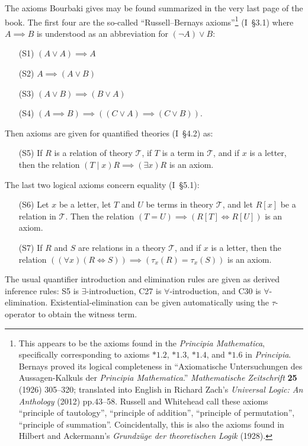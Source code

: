 \documentclass{amsart}
\begin{document}
The axioms Bourbaki gives may be found summarized in the very last page
of the book. The first four are the so-called ``Russell--Bernays
axioms''\footnote{This appears to be the axioms found in the
\textit{Principia Mathematica}, specifically corresponding to axioms
$*1.2$, $*1.3$, $*1.4$, and $*1.6$ in \textit{Principia}. Bernays proved
its logical completeness in ``Axiomatische Untersuchungen des
Aussagen-Kalkuls der \textit{Principia Mathematica}.''
\textit{Mathematische Zeitschrift} \textbf{25} (1926) 305--320;
translated into English in Richard Zach's \textit{Universal Logic: An
  Anthology} (2012) pp.43--58. Russell and Whitehead call these axioms
``principle of tautology'', ``principle of addition'',
``principle of permutation'', ``principle of
summation''. Coincidentally, this is also the axioms found in Hilbert
and Ackermann's \textit{Grundz\"{u}ge der theoretischen Logik} (1928).} (I~\S3.1) where $A\implies B$ is
understood as an abbreviation for $(\neg A)\lor B$:
\begin{itemize}
\item[(S1)] $(A\lor A)\implies A$
\item[(S2)] $A\implies(A\lor B)$
\item[(S3)] $(A\lor B)\implies(B\lor A)$
\item[(S4)] $(A\implies B)\implies((C\lor A)\implies(C\lor B))$.
\end{itemize}
Then axioms are given for quantified theories (I~\S4.2) as:
\begin{itemize}
\item[(S5)] If $R$ is a relation of theory $\mathscr{T}$, if $T$ is a
  term in $\mathscr{T}$, and if $x$ is a letter, then the relation
  $(T\mid x)R\implies(\exists x)R$ is an axiom.
\end{itemize}
The last two logical axioms concern equality (I~\S5.1):
\begin{itemize}
\item[(S6)] Let $x$ be a letter, let $T$ and $U$ be terms in theory $\mathscr{T}$,
  and let $R[x]$ be a relation in $\mathscr{T}$. Then the relation
  $(T=U)\implies(R[T]\iff R[U])$ is an axiom.
\item[(S7)] If $R$ and $S$ are relations in a theory $\mathscr{T}$,
  and if $x$ is a letter, then the relation $((\forall x)(R\iff S))\implies(\tau_{x}(R)=\tau_{x}(S))$
  is an axiom.
\end{itemize}
The usual quantifier introduction and elimination rules are given as
derived inference rules: S5 is $\exists$-introduction,
C27 is $\forall$-introduction, and
C30 is $\forall$-elimination. Existential-elimination can be given
automatically using the $\tau$-operator to obtain the witness term.
\end{document}
